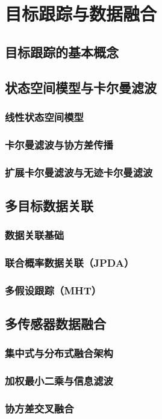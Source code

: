 \chapter{目标跟踪与数据融合}
\section{目标跟踪的基本概念}
\section{状态空间模型与卡尔曼滤波}
\subsection{线性状态空间模型}
\subsection{卡尔曼滤波与协方差传播}
\subsection{扩展卡尔曼滤波与无迹卡尔曼滤波}
\section{多目标数据关联}
\subsection{数据关联基础}
\subsection{联合概率数据关联（JPDA）}
\subsection{多假设跟踪（MHT）}
\section{多传感器数据融合}
\subsection{集中式与分布式融合架构}
\subsection{加权最小二乘与信息滤波}
\subsection{协方差交叉融合}